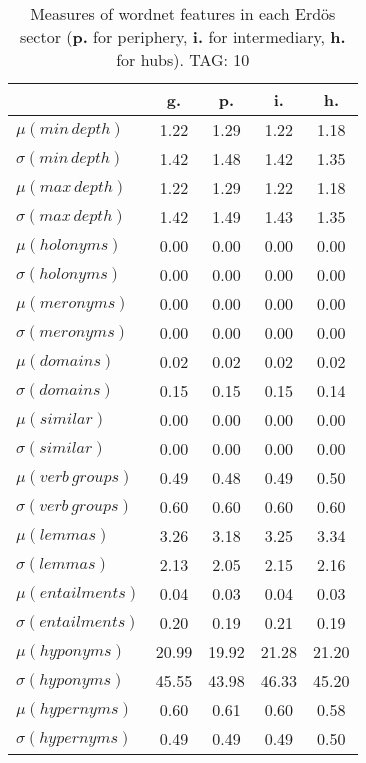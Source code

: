 \begin{table}[h!]
\begin{center}
\begin{tabular}{| l || c | c | c | c |}\hline
 & {\bf g.} & {\bf p.} & {\bf i.} & {\bf h.} \\\hline\hline
$\mu(min\,depth)$ & 1.22  & 1.29  & 1.22  & 1.18 \\
$\sigma(min\,depth)$ & 1.42  & 1.48  & 1.42  & 1.35 \\\hline
$\mu(max\,depth)$ & 1.22  & 1.29  & 1.22  & 1.18 \\
$\sigma(max\,depth)$ & 1.42  & 1.49  & 1.43  & 1.35 \\\hline
$\mu(holonyms)$ & 0.00  & 0.00  & 0.00  & 0.00 \\
$\sigma(holonyms)$ & 0.00  & 0.00  & 0.00  & 0.00 \\\hline
$\mu(meronyms)$ & 0.00  & 0.00  & 0.00  & 0.00 \\
$\sigma(meronyms)$ & 0.00  & 0.00  & 0.00  & 0.00 \\\hline
$\mu(domains)$ & 0.02  & 0.02  & 0.02  & 0.02 \\
$\sigma(domains)$ & 0.15  & 0.15  & 0.15  & 0.14 \\\hline
$\mu(similar)$ & 0.00  & 0.00  & 0.00  & 0.00 \\
$\sigma(similar)$ & 0.00  & 0.00  & 0.00  & 0.00 \\\hline
$\mu(verb\,groups)$ & 0.49  & 0.48  & 0.49  & 0.50 \\
$\sigma(verb\,groups)$ & 0.60  & 0.60  & 0.60  & 0.60 \\\hline
$\mu(lemmas)$ & 3.26  & 3.18  & 3.25  & 3.34 \\
$\sigma(lemmas)$ & 2.13  & 2.05  & 2.15  & 2.16 \\\hline
$\mu(entailments)$ & 0.04  & 0.03  & 0.04  & 0.03 \\
$\sigma(entailments)$ & 0.20  & 0.19  & 0.21  & 0.19 \\\hline
$\mu(hyponyms)$ & 20.99  & 19.92  & 21.28  & 21.20 \\
$\sigma(hyponyms)$ & 45.55  & 43.98  & 46.33  & 45.20 \\\hline
$\mu(hypernyms)$ & 0.60  & 0.61  & 0.60  & 0.58 \\
$\sigma(hypernyms)$ & 0.49  & 0.49  & 0.49  & 0.50 \\\hline
\end{tabular}
\caption{Measures of wordnet features in each Erd\"os sector ({{\bf p.}} for periphery, {{\bf i.}} for intermediary, {{\bf h.}} for hubs). TAG: 10}
\end{center}
\end{table}